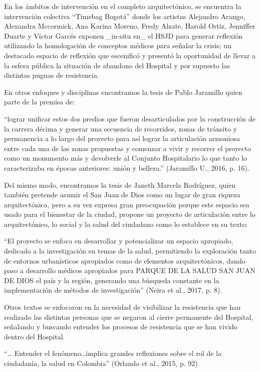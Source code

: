 En los ámbitos de intervención en el completo arquitectónico, se encuentra la intervención colectiva “Timebag Bogotá” donde los artistas Alejandro Arango, Alexandra Mccormick, Ana Karina Moreno, Fredy Alzate, Harold Ortiz, Jenniffer Duarte y Víctor Garcés exponen _in-situ en_ el HSJD para generar reflexión utilizando la homologación de conceptos médicos para señalar la crisis; un destacado espacio de reflexión que escenificó y presentó la oportunidad de llevar a la esfera pública la situación de abandono del Hospital y por supuesto las distintas pugnas de resistencia.

En otros enfoques y disciplinas encontramos la tesis de Pablo Jaramillo quien parte de la premisa de:

“lograr unificar estos dos predios que fueron desarticulados por la construcción de la carrera décima y generar una secuencia de recorridos, zonas de tránsito y permanencia a lo largo del proyecto para así lograr la articulación armoniosa entre cada una de las zonas propuestas y comenzar a vivir y recorrer el proyecto como un monumento más y devolverle al Conjunto Hospitalario lo que tanto lo caracterizaba en épocas anteriores: unión y belleza.” (Jaramillo U., 2016, p. 16).

Del mismo modo, encontramos la tesis de Janeth Marcela Rodríguez, quien también pretende asumir el San Juan de Dios como un lugar de gran riqueza arquitectónica, pero a su vez expresa gran preocupación porque este espacio sea usado para el bienestar de la ciudad, propone un proyecto de articulación entre lo arquitectónico, lo social y la salud del ciudadano como lo establece en su texto:

“El proyecto se enfoca en desarrollar y potencializar un espacio apropiado, dedicado a la investigación en temas de la salud, permitiendo la exploración tanto de entornos urbanísticos apropiados como de elementos arquitectónicos, dando paso a desarrollo médicos apropiados para PARQUE DE LA SALUD SAN JUAN DE DIOS el país y la región, generando una búsqueda constante en la implementación de métodos de investigación” (Neira et al., 2017, p. 8).

Otros textos se enfocaron en la necesidad de visibilizar la resistencia que han realizado las distintas personas que se negaron al cierre permanente del Hospital, señalando y buscando entender los procesos de resistencia que se han vivido dentro del Hospital.

“… Entender el fenómeno…implica grandes reflexiones sobre el rol de la ciudadanía, la salud en Colombia” (Orlando et al., 2015, p. 92)

